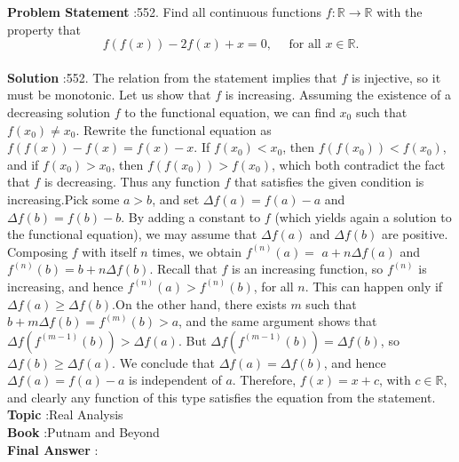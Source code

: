 \documentclass[10pt]{article}
\begin{document}
\textbf{Problem Statement} :552. Find all continuous functions $f: \mathbb{R} \rightarrow \mathbb{R}$ with the property that$$ f(f(x))-2 f(x)+x=0, \quad \text { for all } x \in \mathbb{R} . $$\\
\textbf{Solution} :552. The relation from the statement implies that $f$ is injective, so it must be monotonic. Let us show that $f$ is increasing. Assuming the existence of a decreasing solution $f$ to the functional equation, we can find $x_{0}$ such that $f\left(x_{0}\right) \neq x_{0}$. Rewrite the functional equation as $f(f(x))-f(x)=f(x)-x$. If $f\left(x_{0}\right)<x_{0}$, then $f\left(f\left(x_{0}\right)\right)<f\left(x_{0}\right)$, and if $f\left(x_{0}\right)>x_{0}$, then $f\left(f\left(x_{0}\right)\right)>f\left(x_{0}\right)$, which both contradict the fact that $f$ is decreasing. Thus any function $f$ that satisfies the given condition is increasing.Pick some $a>b$, and set $\Delta f(a)=f(a)-a$ and $\Delta f(b)=f(b)-b$. By adding a constant to $f$ (which yields again a solution to the functional equation), we may assume that $\Delta f(a)$ and $\Delta f(b)$ are positive. Composing $f$ with itself $n$ times, we obtain $f^{(n)}(a)=$ $a+n \Delta f(a)$ and $f^{(n)}(b)=b+n \Delta f(b)$. Recall that $f$ is an increasing function, so $f^{(n)}$ is increasing, and hence $f^{(n)}(a)>f^{(n)}(b)$, for all $n$. This can happen only if $\Delta f(a) \geq \Delta f(b)$.On the other hand, there exists $m$ such that $b+m \Delta f(b)=f^{(m)}(b)>a$, and the same argument shows that $\Delta f\left(f^{(m-1)}(b)\right)>\Delta f(a)$. But $\Delta f\left(f^{(m-1)}(b)\right)=\Delta f(b)$, so $\Delta f(b) \geq \Delta f(a)$. We conclude that $\Delta f(a)=\Delta f(b)$, and hence $\Delta f(a)=f(a)-a$ is independent of $a$. Therefore, $f(x)=x+c$, with $c \in \mathbb{R}$, and clearly any function of this type satisfies the equation from the statement.\\
\textbf{Topic} :Real Analysis\\
\textbf{Book} :Putnam and Beyond\\
\textbf{Final Answer} :\\
\end{document}

